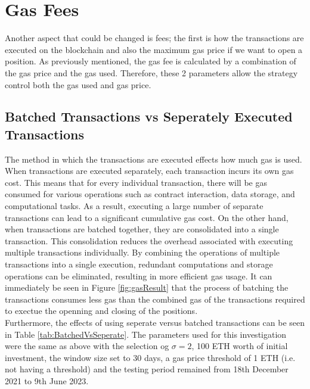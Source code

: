 \section{Gas Fees}
Another aspect that could be changed is fees; the first is how the transactions are executed on the blockchain and also the maximum gas price if we want to open a position. As previously mentioned, the gas fee is calculated by a combination of the gas price and the gas used. Therefore, these 2 parameters allow the strategy control both the gas used and gas price.

\subsection{Batched Transactions vs Seperately Executed Transactions}
The method in which the transactions are executed effects how much gas is used. When transactions are executed separately, each transaction incurs its own gas cost. This means that for every individual transaction, there will be gas consumed for various operations such as contract interaction, data storage, and computational tasks. As a result, executing a large number of separate transactions can lead to a significant cumulative gas cost. On the other hand, when transactions are batched together, they are consolidated into a single transaction. This consolidation reduces the overhead associated with executing multiple transactions individually. By combining the operations of multiple transactions into a single execution, redundant computations and storage operations can be eliminated, resulting in more efficient gas usage. It can immediately be seen in Figure  \ref{fig:gasResult} that the process of batching the transactions consumes less gas than the combined gas of the transactions required to exectue the openning and closing of the positions.
\\[5mm]
Furthermore, the effects of using seperate versus batched transactions can be seen in Table \ref{tab:BatchedVsSeperate}. The parameters used for this investigation were the same as above with the selection og $\sigma = 2$, 100 ETH worth of initial investment, the window size set to 30 days, a gas price threshold of 1 ETH (i.e. not having a threshold) and the testing period remained from 18th December 2021 to 9th June 2023.

